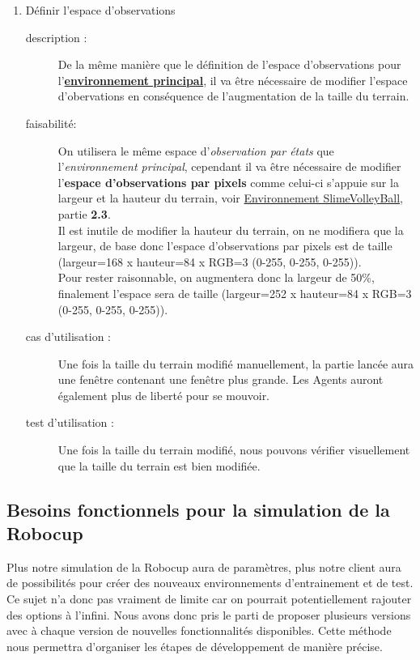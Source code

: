 \documentclass[11pt, a4paper]{article}
\newcommand{\besoinVItem}[5]{
	\item #1
	\begin{description}
		\item[description :]
		#2 
		\item[faisabilité: ]
		#3
		\item[cas d'utilisation :]
		#4
		\item[test d'utilisation :]      
		#5
	\end{description}
}
\begin{document}
\begin{itemize}
\begin{enumerate}

	\besoinVItem{Définir l'espace d'observations}
	{ 

		De la même manière que le définition de l'espace d'observations pour l'\hyperlink{link3}{\textbf{environnement principal}}, il va être nécessaire de modifier l'espace d'obervations en conséquence de l'augmentation
		de la taille du terrain.

	}
	{

		On utilisera le même espace d'\textit{observation par états} que l'\textit{environnement principal}, cependant il va être nécessaire de modifier l'\textbf{espace d'observations par pixels} comme celui-ci s'appuie sur la largeur et la 
		hauteur du terrain, voir \href{/annexes/Environnement_SlimeVolleyBall.pdf}{Environnement SlimeVolleyBall}, partie \textbf{2.3}. \\
		Il est inutile de modifier la hauteur du terrain, on ne modifiera que la largeur, de base donc l'espace d'observations par pixels est de taille (largeur=168 x hauteur=84 x RGB=3 (0-255, 0-255, 0-255)).\\
		Pour rester raisonnable, on augmentera donc la largeur de 50\%, finalement l'espace sera de taille (largeur=252 x hauteur=84 x RGB=3 (0-255, 0-255, 0-255)).


	}
	{
		Une fois la taille du terrain modifié manuellement, la partie lancée aura une fenêtre contenant une fenêtre plus grande. Les Agents auront également plus de liberté pour se mouvoir.
	}
	{
        Une fois la taille du terrain modifié, nous pouvons vérifier visuellement que la taille du terrain est bien modifiée.
	} 



\end{enumerate}

\end{itemize}

  


\newpage

\subsection{Besoins fonctionnels pour la simulation de la Robocup}


Plus notre simulation de la Robocup aura de paramètres, plus notre client aura de possibilités pour créer des nouveaux environnements d'entrainement et de test. Ce sujet n'a donc pas vraiment de limite car on pourrait potentiellement rajouter des options à l'infini. Nous avons donc pris le parti de proposer plusieurs versions avec à chaque version de nouvelles fonctionnalités disponibles. Cette méthode nous permettra d'organiser les étapes de développement de manière précise. 
 
\end{document}
